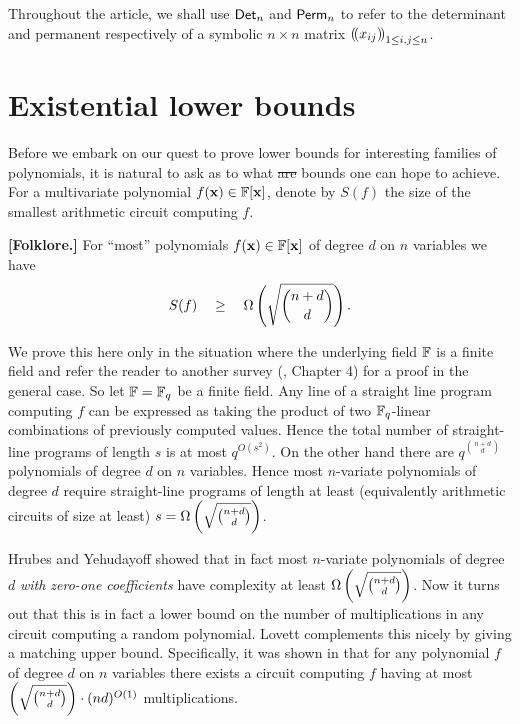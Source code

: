 \documentclass{birkjour}
\newcommand{\spaced}[1]{\quad#1\quad}
\providecommand{\DIFdeltex}[1]{{\protect\color{red}\sout{#1}}}                      %
\providecommand{\DIFdelbegin}{} %
\providecommand{\DIFdelend}{} %
\providecommand{\DIFdel}[1]{\texorpdfstring{\DIFdeltex{#1}}{}} %
\begin{document}
\begin{remark*} Throughout the article, we shall use $\mathsf{Det}_n$ and $\mathsf{Perm}_n$ to refer to the determinant and permanent respectively of a symbolic $n\times n$ matrix $\left(\!\left(x_{ij}\right)\!\right)_{1\leq i,j\leq n}$. 

\end{remark*}

	
	
	
	



\section{Existential lower bounds}\label{sec:random}
Before we embark on our quest to prove lower bounds for interesting
families of polynomials, it is natural to ask as to what \DIFdelbegin \DIFdel{are }\DIFdelend bounds
one can hope to achieve.  For a multivariate polynomial 
$f(\mathbf{x}) \in \mathbb{F}[\mathbf{x}]$, denote by $S(f)$ the size of 
the smallest arithmetic circuit computing
$f$.  
\begin{theorem}
	{\bf [Folklore.]}
  For ``most'' polynomials $f(\mathbf{x}) \in \mathbb{F}[\mathbf{x}]$ of degree $d$ 
  on $n$ variables we have 
  $$ S(f) \spaced{\geq} \Omega \inparen{\sqrt{\binom{n + d}{d}}}. $$
\end{theorem}
\begin{proof-sketch}
  We prove this here only in the situation where the underlying field
  $\mathbb{F}$ is a finite field and refer the reader to another survey
  (\cite{ckw11}, Chapter 4) for a proof in the general case. So let
  $\mathbb{F} = \mathbb{F}_{q}$ be a finite field. Any line of a straight line
  program computing $f$ can be expressed as taking the product of two
  $\mathbb{F}_q$-linear combinations of previously computed values. Hence the
  total number of straight-line programs of length $s$ is at most
  $q^{O(s^2)}$. On the other hand there are $q^{\binom{n+d}{d}}$
  polynomials of degree $d$ on $n$ variables.  Hence most $n$-variate
  polynomials of degree $d$ require straight-line programs of length
  at least (equivalently arithmetic circuits of size at least) $s =
  \Omega \left(\sqrt{\binom{n+d}{d}}\right)$.
	\end{proof-sketch}

\noindent	Hrubes and Yehudayoff \cite {hy11} showed that in fact 
	most $n$-variate polynomials of degree $d$ {\em with zero-one 
	coefficients} have complexity at least $\Omega\left(\sqrt{\binom{n+d}{d}}\right)$. 
	Now it turns out that this is in fact a lower bound on the 
	number of multiplications in any circuit computing a random 
	polynomial. Lovett \cite{lovett11} complements this 
	nicely by giving a matching upper bound. Specifically, 
	it was shown in \cite{lovett11} that for any polynomial $f$ 
	of degree $d$ on $n$ variables there exists a circuit computing 
	$f$ having at most $\left(\sqrt{\binom{n + d}{d}}\right) \cdot (nd)^{O(1)} $ 
	multiplications.
\end{document}
